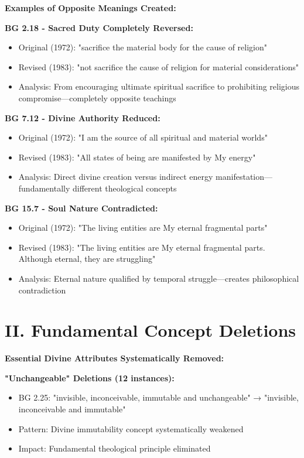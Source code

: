 \documentclass[11pt,twoside]{book}
\begin{document}
\textbf{\textbf{Examples of Opposite Meanings Created:}}

\textbf{\textbf{BG 2.18 - Sacred Duty Completely Reversed:}}
\begin{itemize}
\item Original (1972): "sacrifice the material body for the cause of religion"
\item Revised (1983): "not sacrifice the cause of religion for material considerations"
\item Analysis: From encouraging ultimate spiritual sacrifice to prohibiting religious 
compromise—completely opposite teachings
\end{itemize}

\textbf{\textbf{BG 7.12 - Divine Authority Reduced:}}
\begin{itemize}
\item Original (1972): "I am the source of all spiritual and material worlds"
\item Revised (1983): "All states of being are manifested by My energy"
\item Analysis: Direct divine creation versus indirect energy 
manifestation—fundamentally different theological concepts
\end{itemize}

\textbf{\textbf{BG 15.7 - Soul Nature Contradicted:}}
\begin{itemize}
\item Original (1972): "The living entities are My eternal fragmental parts"
\item Revised (1983): "The living entities are My eternal fragmental parts. Although eternal, they are struggling"
\item Analysis: Eternal nature qualified by temporal struggle—creates philosophical 
contradiction
\end{itemize}
\section*{II. Fundamental Concept Deletions}
\label{sec:org036dc4b}

\textbf{\textbf{Essential Divine Attributes Systematically Removed:}}

\textbf{\textbf{"Unchangeable" Deletions (12 instances):}}
\begin{itemize}
\item BG 2.25: "invisible, inconceivable, immutable and unchangeable" → "invisible, inconceivable and immutable"
\item Pattern: Divine immutability concept systematically weakened
\item Impact: Fundamental theological principle eliminated
\end{itemize}
\end{document}
